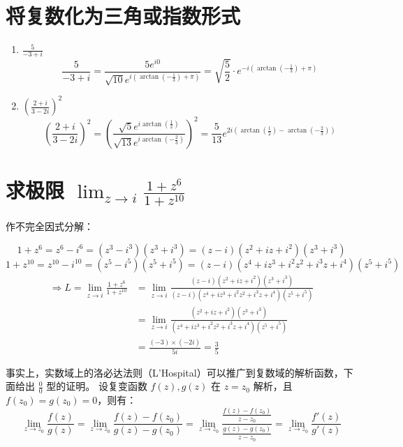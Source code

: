 \documentclass[UTF8]{report}
\theoremstyle{MyLineTheoremStyle} %
\theoremstyle{MyBlockTheoremStyle} %
\theoremstyle{MySubsubsectionStyle} %
\begin{document}
\section{将复数化为三角或指数形式}

\begin{enumerate}
\item $\frac{5}{-3 + i}$
\begin{equation*}
    \frac{5}{-3 + i} = \frac{5e^{i0}}{\sqrt{10}e^{i (\arctan (-\frac{1}{3}) + \pi)}} = \sqrt{\frac{5}{2}}\cdot e^{-i (\arctan (-\frac{1}{3}) + \pi)}
\end{equation*}
\item $\left(\frac{2+i}{3-2i}\right)^2$ 
\begin{equation*}
    \left(\frac{2+i}{3-2i}\right)^2 
    = \left( \frac{\sqrt{5}e^{i \arctan(\frac{1}{2})}}{\sqrt{13}e^{i \arctan(-\frac{2}{3})}} \right)^2 
    = \frac{5}{13} e^{2i\left(\arctan(\frac{1}{2}) - \arctan(-\frac{2}{3})\right) }
\end{equation*}
\end{enumerate}

\section{求极限 $\lim_{z\to i} \frac{1+z^6}{1+z^{10}}$}
作不完全因式分解：

\begin{equation*}
    1+z^6 = z^6 - i^6 
    = (z^3 - i^3)(z^3 + i^3) = (z - i)(z^2 + iz +i^2)(z^3 + i^3)
\end{equation*}
\begin{equation*}
    1+z^{10} 
    = z^{10} - i^{10} = (z^5-i^5)(z^5+i^5) 
    = (z-i)(z^4 + iz^3 + i^2z^2 + i^3z + i^4 )(z^5+i^5)
\end{equation*}
\begin{equation*}
    \begin{aligned}
        \Longrightarrow L 
        = \lim_{z\to i} \frac{1+z^6}{1+z^{10}} 
        &= \lim_{z\to i} \frac{(z - i)(z^2 + iz +i^2)(z^3 + i^3)}{(z-i)(z^4 + iz^3 + i^2z^2 + i^3z + i^4 )(z^5+i^5)} \\
        &= \lim_{z\to i} \frac{(z^2 + iz +i^2)(z^3 + i^3)}{(z^4 + iz^3 + i^2z^2 + i^3z + i^4 )(z^5+i^5)} \\
        &= \frac{(-3)\times (-2i)}{ 5 i} = \frac{3}{5}
        \end{aligned}
\end{equation*}

事实上，实数域上的洛必达法则（L'Hospital）可以推广到复数域的解析函数，下面给出 $\frac{0}{0}$ 型的证明。
设复变函数 $f(z), g(z)$ 在 $z = z_0$ 解析，且 $f(z_0) = g(z_0) = 0$，则有：
\begin{equation*}
\lim_{z\to z_0} \frac{f(z)}{g(z)} 
= \lim_{z\to z_0} \frac{f(z) - f(z_0)}{g(z) - g(z_0)} 
= \lim_{z\to z_0} \frac{\frac{f(z) - f(z_0)}{z-z_0}}{\frac{g(z) - g(z_0)}{z-z_0}} 
= \lim_{z\to z_0} \frac{f'(z)}{g'(z)}
\end{equation*}
\end{document}
